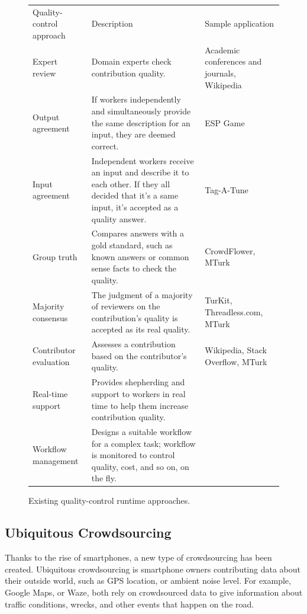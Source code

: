 \documentclass[9pt,twocolumn]{article}
\begin{document}
	\begin{figure}

		\begin{tabularx}{\textwidth}{|lXX|}
			\rowcolor{gray!50}
			\hline
			Quality-control approach & Description & Sample application \\
			Expert review & Domain experts check contribution quality. & Academic conferences and journals, Wikipedia \\
			Output agreement 		& If workers independently and simultaneously provide the same description for an input, they are deemed correct. & ESP Game \\
			Input agreement 		& Independent workers receive an input and describe it to each other.
			If they all decided that it's a same input, it's accepted as a quality answer. & Tag-A-Tune \\
			Group truth 			& Compares answers with a gold standard, such as known answers or common sense facts to check the quality. & CrowdFlower, MTurk \\
			Majority consensus 		& The judgment of a majority of reviewers on the contribution's quality is accepted as its real quality. & TurKit, Threadless.com, MTurk \\
			Contributor evaluation 	& Assesses a contribution based on the contributor's quality. & Wikipedia, Stack Overflow, MTurk \\
			Real-time support 		& Provides shepherding and support to workers in real time to help them increase contribution quality. & \\
			Workflow management 	& Designs a suitable workflow for a complex task; workflow is monitored to control quality, cost, and so on, on the fly. & \\
			 \hline
		\end{tabularx}
	\caption{Existing quality-control runtime approaches.}
	\label{fig-tbl2}
	\end{figure}
	
	\subsection*{Ubiquitous Crowdsourcing}
	
	Thanks to the rise of smartphones, a new type of crowdsourcing has been created. Ubiquitous crowdsourcing is smartphone owners contributing data about their outside world, such as GPS location, or ambient noise level. For example, Google Maps, or Waze, both rely on crowdsourced data to give information about traffic conditions, wrecks, and other events that happen on the road. 
	
\end{document}
